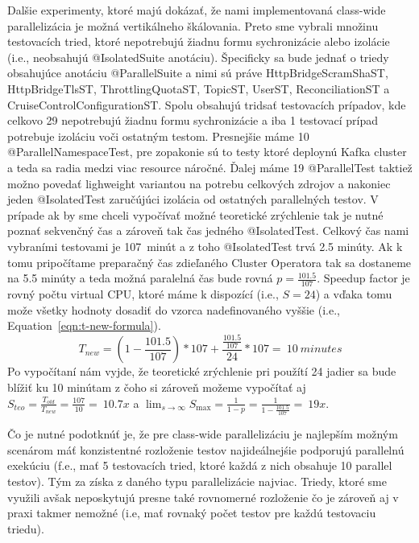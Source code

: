 Dalšie experimenty, ktoré majú dokázať, že nami implementovaná class-wide parallelizácia je možná vertikálneho škálovania.
Preto sme vybrali množinu testovacích tried, ktoré nepotrebujú žiadnu formu sychronizácie alebo izolácie (i.e., neobsahujú @IsolatedSuite anotáciu).
Špecificky sa bude jednať o triedy obsahujúce anotáciu @ParallelSuite a nimi sú práve HttpBridgeScramShaST, HttpBridgeTlsST,
ThrottlingQuotaST, TopicST, UserST, ReconciliationST a CruiseControlConfigurationST. Spolu obsahujú tridsať testovacích
prípadov, kde celkovo 29 nepotrebujú žiadnu formu sychronizácie a iba 1 testovací prípad potrebuje izoláciu voči ostatným testom.
Presnejšie máme 10 @ParallelNamespaceTest, pre zopakonie sú to testy ktoré deploynú Kafka cluster a teda sa radia medzi
viac resource náročné.
Ďalej máme 19 @ParallelTest taktiež možno povedať lighweight variantou na potrebu celkových zdrojov a nakoniec jeden @IsolatedTest
zaručújúci izolácia od ostatných parallelných testov.
V prípade ak by sme chceli vypočívať možné teoretické zrýchlenie tak je nutné poznať sekvenčný čas a zároveň tak čas jedného @IsolatedTest.
Celkový čas nami vybraními testovami je 107~minút a z toho @IsolatedTest trvá 2.5 minúty.
Ak k tomu pripočítame preparačný čas zdieľaného Cluster Operatora tak sa dostaneme na 5.5 minúty a teda možná paralelná čas bude rovná $p = \frac{101.5}{107}$.
Speedup factor je rovný počtu virtual CPU, ktoré máme k dispozící (i.e., $S=24$) a vďaka tomu može všetky hodnoty dosadiť do
vzorca nadefinovaného vyššie (i.e., Equation~\eqref{eqn:t-new-formula}).
\begin{equation}
    \label{eqn:class-wide-time-ocp}
    T_{new} = (1 - \frac{101.5}{107}) * 107 +  \frac{\frac{101.5}{107}}{24} * 107 =~10~minutes
    \tag{6}
\end{equation}
Po vypočítaní nám vyjde, že teoretické zrýchlenie pri použítí 24 jadier sa bude blížiť ku 10 minútam z čoho si zároveň
možeme vypočítať aj $S_{teo} = \frac{T_{old}}{T_{new}} = \frac{107}{10} =~10.7x$ a $\lim_{s\to\infty} S_{\max} = \frac{1}{1-p} = \frac{1}{1-\frac{101.5}{107}} =~19x$.

Čo je nutné podotknúť je, že pre class-wide parallelizáciu je najlepším možným scenárom máť konzistentné rozloženie testov
najideálnejśie podporujú parallelnú exekúciu (f.e., mať 5 testovacích tried, ktoré každá z nich obsahuje 10 parallel testov).
Tým za získa z daného typu parallelizácie najviac.
Triedy, ktoré sme využili avšak neposkytujú presne také rovnomerné rozloženie čo je zároveň aj v praxi takmer nemožné
(i.e, mať rovnaký počet testov pre každú testovaciu triedu).

